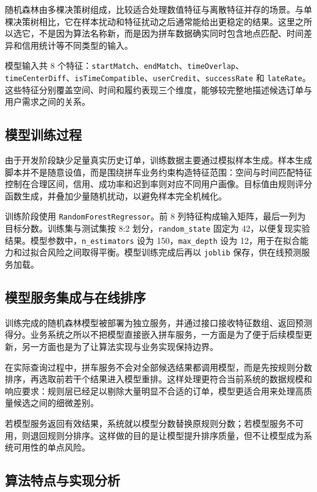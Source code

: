 随机森林由多棵决策树组成，比较适合处理数值特征与离散特征并存的场景。与单棵决策树相比，它在样本扰动和特征扰动之后通常能给出更稳定的结果。这里之所以选它，不是因为算法名称新，而是因为拼车数据确实同时包含地点匹配、时间差异和信用统计等不同类型的输入。

模型输入共 8 个特征：\texttt{startMatch}、\texttt{endMatch}、\texttt{timeOverlap}、\texttt{timeCenterDiff}、\texttt{isTimeCompatible}、\texttt{userCredit}、\texttt{successRate} 和 \texttt{lateRate}。这些特征分别覆盖空间、时间和履约表现三个维度，能够较完整地描述候选订单与用户需求之间的关系。

\subsection{模型训练过程}

由于开发阶段缺少足量真实历史订单，训练数据主要通过模拟样本生成。样本生成脚本并不是随意设值，而是围绕拼车业务约束构造特征范围：空间与时间匹配特征控制在合理区间，信用、成功率和迟到率则对应不同用户画像。目标值由规则评分函数生成，并叠加少量随机扰动，以避免样本完全机械化。

训练阶段使用 \texttt{RandomForestRegressor}。前 8 列特征构成输入矩阵，最后一列为目标分数。训练集与测试集按 8:2 划分，\texttt{random\_state} 固定为 42，以便复现实验结果。模型参数中，\texttt{n\_estimators} 设为 150，\texttt{max\_depth} 设为 12，用于在拟合能力和过拟合风险之间取得平衡。模型训练完成后再以 \texttt{joblib} 保存，供在线预测服务加载。

\subsection{模型服务集成与在线排序}

训练完成的随机森林模型被部署为独立服务，并通过接口接收特征数组、返回预测得分。业务系统之所以不把模型直接嵌入拼车服务，一方面是为了便于后续模型更新，另一方面也是为了让算法实现与业务实现保持边界。

在实际查询过程中，拼车服务不会对全部候选结果都调用模型，而是先按规则分数排序，再选取前若干个结果进入模型重排。这样处理更符合当前系统的数据规模和响应要求：规则层已经足以剔除大量明显不合适的订单，模型更适合用来处理高质量候选之间的细微差别。

若模型服务返回有效结果，系统就以模型分数替换原规则分数；若模型服务不可用，则退回规则分排序。这样做的目的是让模型提升排序质量，但不让模型成为系统可用性的单点风险。

\subsection{算法特点与实现分析}

